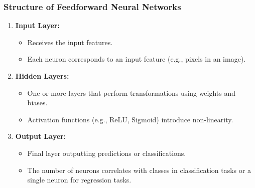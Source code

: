 \documentclass[aspectratio=169]{beamer}
\begin{document}
\begin{frame}[fragile]
    \frametitle{Structure of Feedforward Neural Networks}
    \begin{enumerate}
        \item \textbf{Input Layer:} 
        \begin{itemize}
            \item Receives the input features.
            \item Each neuron corresponds to an input feature (e.g., pixels in an image).
        \end{itemize}
        
        \item \textbf{Hidden Layers:}
        \begin{itemize}
            \item One or more layers that perform transformations using weights and biases.
            \item Activation functions (e.g., ReLU, Sigmoid) introduce non-linearity.
        \end{itemize}
        
        \item \textbf{Output Layer:}
        \begin{itemize}
            \item Final layer outputting predictions or classifications.
            \item The number of neurons correlates with classes in classification tasks or a single neuron for regression tasks.
        \end{itemize}
    \end{enumerate}
\end{frame}
\end{document}
